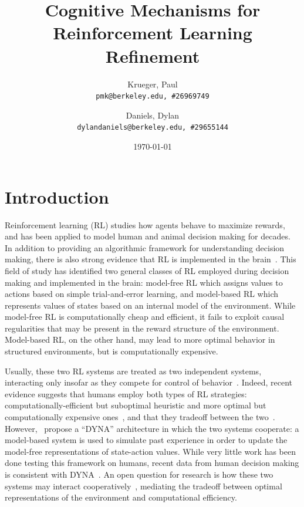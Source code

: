 \documentclass[notitlepage]{article}
\title{Cognitive Mechanisms for Reinforcement Learning Refinement}
\author{
  Krueger, Paul\\
  \texttt{pmk@berkeley.edu,\ \#26969749}
  \and
  Daniels, Dylan\\
  \texttt{dylandaniels@berkeley.edu,\ \#29655144}
}
\date{\today}
\begin{document}
\maketitle

\section*{Introduction}

Reinforcement learning (RL) studies how agents behave to maximize rewards, and has been applied to model human and animal decision making for decades. In addition to providing an algorithmic framework for understanding decision making, there is also strong evidence that RL is implemented in the brain~\cite{daw2005uncertainty}. This field of study has identified two general classes of RL employed during decision making and implemented in the brain: model-free RL which assigns values to actions based on simple trial-and-error learning, and model-based RL which represents values of states based on an internal model of the environment. While model-free RL is computationally cheap and efficient, it fails to exploit causal regularities that may be present in the reward structure of the environment. Model-based RL, on the other hand, may lead to more optimal behavior in structured environments, but is computationally expensive.

Usually, these two RL systems are treated as two independent systems, interacting only insofar as they compete for control of behavior~\cite{dolan2013goals}. Indeed, recent evidence suggests that humans employ both types of RL strategies: computationally-efficient but suboptimal heuristic and more optimal but computationally expensive ones~\cite{wilson2014humans}, and that they tradeoff between the two~\cite{wilson2015tradeoff}. However,~\cite{sutton1998reinforcement} propose a ``DYNA'' architecture in which the two systems cooperate: a model-based system is used to simulate past experience in order to update the model-free representations of state-action values. While very little work has been done testing this framework on humans, recent data from human decision making is consistent with DYNA~\cite{gershman2014retrospective}. An open question for research is how these two systems may interact cooperatively~\cite{gershman2015reinforcement}, mediating the tradeoff between optimal representations of the environment and computational efficiency.
\end{document}

